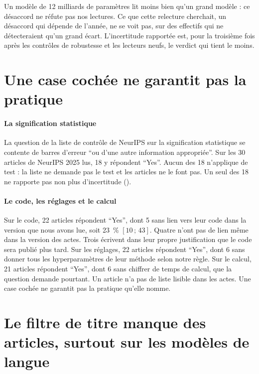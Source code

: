 Un modèle de 12 milliards de paramètres lit moins bien qu'un grand modèle : ce désaccord ne réfute
pas nos lectures. Ce que cette relecture cherchait, un désaccord qui
dépende de l'année, ne se voit pas, sur des effectifs qui ne détecteraient qu'un grand écart.
L'incertitude rapportée est, pour la troisième fois après les contrôles de robustesse et les lecteurs
neufs, le verdict qui tient le moins.

\section{Une case cochée ne garantit pas la pratique}\label{sec:sr-declarations}

\paragraph{La signification statistique}
La question de la liste de contrôle de NeurIPS sur la signification statistique se contente de barres
d'erreur \enquote{ou d'une autre information appropriée}. Sur les 30 articles de NeurIPS 2025 lus, 18
y répondent \enquote{Yes}. Aucun des 18 n'applique de test : la liste ne demande pas le test et les
articles ne le font pas. Un seul des 18 ne rapporte pas non plus d'incertitude ().

\paragraph{Le code, les réglages et le calcul}
Sur le code, 22 articles répondent \enquote{Yes}, dont 5 sans lien vers leur code dans la version que
nous avons lue, soit 23~\% $[10\,;\,43]$. Quatre n'ont pas de lien même dans la version des actes. Trois
écrivent dans leur propre justification que le code sera publié plus tard. Sur les réglages, 22 articles
répondent \enquote{Yes}, dont 6 sans donner tous les hyperparamètres de leur méthode selon notre règle.
Sur le calcul, 21 articles répondent \enquote{Yes}, dont 6 sans chiffrer de temps de calcul, que la
question demande pourtant. Un article n'a pas de liste lisible dans les actes. Une case cochée ne
garantit pas la pratique qu'elle nomme.

\section{Le filtre de titre manque des articles, surtout sur les modèles de langue}\label{sec:sr-filtre}

